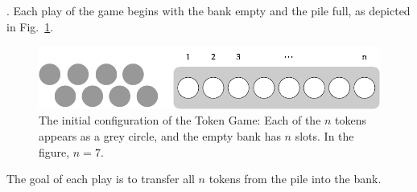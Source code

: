 \medskip

.
Each play of the game begins with the bank empty and the pile full, as
depicted in Fig.~\ref{fig:jeujetonsInit}.
\begin{figure}[htb]
\begin{center}
        \includegraphics[scale=0.35]{FiguresMaths/GameTokenInit.png}
\caption{The initial configuration of the Token Game: Each of the $n$
  tokens appears as a grey circle, and the empty bank has $n$ slots.
  In the figure, $n=7$.}
        \label{fig:jeujetonsInit}
\end{center}
\end{figure}
The goal of each play is to transfer all $n$ tokens from the pile into
the bank.

\medskip

